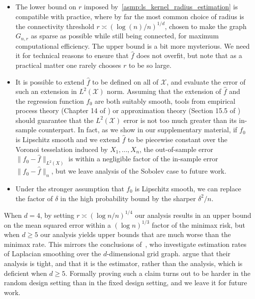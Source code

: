 \documentclass[twoside]{article}
\newcommand{\1}{\mathbf{1}}
\newcommand{\Xset}{\mathcal{X}}
\newcommand{\Leb}{L}
\newcommand{\wh}[1]{\widehat{#1}}
\theoremstyle{definition}
\theoremstyle{remark}
\begin{document}
\begin{itemize}
	\item The lower bound on $r$ imposed by~\ref{asmp:ls_kernel_radius_estimation} is  compatible with practice, where by far the most common choice of radius is the connectivity threshold $r \asymp (\log(n)/n)^{1/d}$, chosen to make the graph $G_{n,r}$ as sparse as possible while still being connected, for maximum computational efficiency. The upper bound is a bit more mysterious. We need it for technical reasons to ensure that $\wh{f}$ does not overfit, but note that as a practical matter one rarely chooses $r$ to be so large.
	\item It is possible to extend $\wh{f}$ to be defined on all of $\Xset$, and evaluate the error of such an extension in $\Leb^2(\Xset)$ norm. Assuming that the extension of $\wh{f}$ and the regression function $f_0$ are both suitably smooth, tools from empirical process theory (Chapter 14 of \citet{wainwright2019}) or approximation theory (Section 15.5 of \citet{johnstone2011}) should guarantee that the $\Leb^2(\Xset)$ error is not too much greater than its in-sample counterpart. In fact, as we show in our supplementary material, if $f_0$ is Lipschitz smooth and we extend $\wh{f}$ to be piecewise constant over the Voronoi tesselation induced by $X_1,\ldots,X_n$, the out-of-sample error $\|f_0 - \wh{f}\|_{\Leb^2(X)}$ is within a negligible factor of the in-sample error $\|f_0 - \wh{f}\|_n$, but we leave analysis of the Sobolev case to future work.
	\item Under the stronger assumption that $f_0$ is Lipschitz smooth, we can replace the factor of $\delta$ in the high probability bound by the sharper $\delta^2/n$.
\end{itemize} 

When $d = 4$, by setting $r \asymp (\log n/n)^{1/4}$ our analysis results in an upper bound on the mean squared error within a $(\log n)^{1/3}$ factor of the minimax risk, but when $d \geq 5$ our analysis yields upper bounds that are much worse than the minimax rate. This mirrors the conclusions of~\citet{sadhanala16}, who investigate estimation rates of Laplacian smoothing over the $d$-dimensional grid graph. \citet{sadhanala16} argue that their analysis is tight, and that it is the estimator, rather than the analysis, which is deficient when $d \geq 5$. Formally proving such a claim turns out to be harder in the random design setting than in the fixed design setting, and we leave it for future work. 
\end{document}
